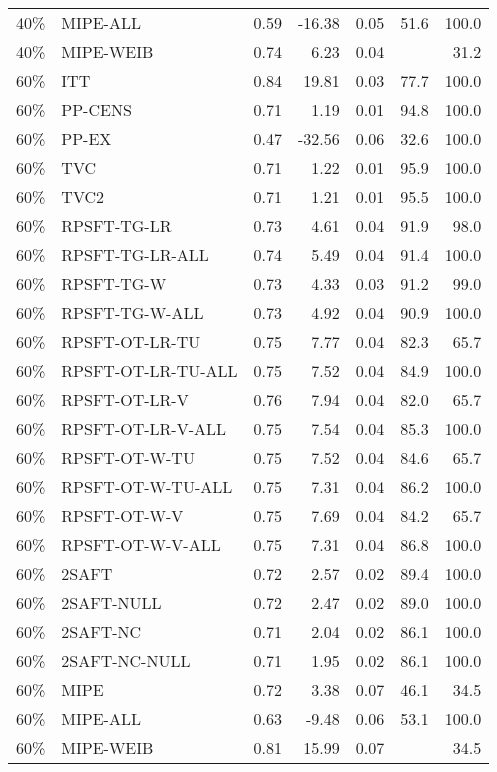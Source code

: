 \begin{table}[ht]
{\begin{tabular}{llrrrrr}
  40\% & MIPE-ALL & 0.59 & -16.38 & 0.05 & 51.6 & 100.0 \\ 
  40\% & MIPE-WEIB & 0.74 & 6.23 & 0.04 &  & 31.2 \\ 
   \hline
60\% & ITT & 0.84 & 19.81 & 0.03 & 77.7 & 100.0 \\ 
  60\% & PP-CENS & 0.71 & 1.19 & 0.01 & 94.8 & 100.0 \\ 
  60\% & PP-EX & 0.47 & -32.56 & 0.06 & 32.6 & 100.0 \\ 
  60\% & TVC & 0.71 & 1.22 & 0.01 & 95.9 & 100.0 \\ 
  60\% & TVC2 & 0.71 & 1.21 & 0.01 & 95.5 & 100.0 \\ 
   \hline
60\% & RPSFT-TG-LR & 0.73 & 4.61 & 0.04 & 91.9 & 98.0 \\ 
  60\% & RPSFT-TG-LR-ALL & 0.74 & 5.49 & 0.04 & 91.4 & 100.0 \\ 
  60\% & RPSFT-TG-W & 0.73 & 4.33 & 0.03 & 91.2 & 99.0 \\ 
  60\% & RPSFT-TG-W-ALL & 0.73 & 4.92 & 0.04 & 90.9 & 100.0 \\ 
  60\% & RPSFT-OT-LR-TU & 0.75 & 7.77 & 0.04 & 82.3 & 65.7 \\ 
  60\% & RPSFT-OT-LR-TU-ALL & 0.75 & 7.52 & 0.04 & 84.9 & 100.0 \\ 
  60\% & RPSFT-OT-LR-V & 0.76 & 7.94 & 0.04 & 82.0 & 65.7 \\ 
  60\% & RPSFT-OT-LR-V-ALL & 0.75 & 7.54 & 0.04 & 85.3 & 100.0 \\ 
   \hline
60\% & RPSFT-OT-W-TU & 0.75 & 7.52 & 0.04 & 84.6 & 65.7 \\ 
  60\% & RPSFT-OT-W-TU-ALL & 0.75 & 7.31 & 0.04 & 86.2 & 100.0 \\ 
  60\% & RPSFT-OT-W-V & 0.75 & 7.69 & 0.04 & 84.2 & 65.7 \\ 
  60\% & RPSFT-OT-W-V-ALL & 0.75 & 7.31 & 0.04 & 86.8 & 100.0 \\ 
   \hline
60\% & 2SAFT & 0.72 & 2.57 & 0.02 & 89.4 & 100.0 \\ 
  60\% & 2SAFT-NULL & 0.72 & 2.47 & 0.02 & 89.0 & 100.0 \\ 
  60\% & 2SAFT-NC & 0.71 & 2.04 & 0.02 & 86.1 & 100.0 \\ 
  60\% & 2SAFT-NC-NULL & 0.71 & 1.95 & 0.02 & 86.1 & 100.0 \\ 
  60\% & MIPE & 0.72 & 3.38 & 0.07 & 46.1 & 34.5 \\ 
  60\% & MIPE-ALL & 0.63 & -9.48 & 0.06 & 53.1 & 100.0 \\ 
  60\% & MIPE-WEIB & 0.81 & 15.99 & 0.07 &  & 34.5 \\ 
   \hline
\end{tabular}
}
\end{table}
